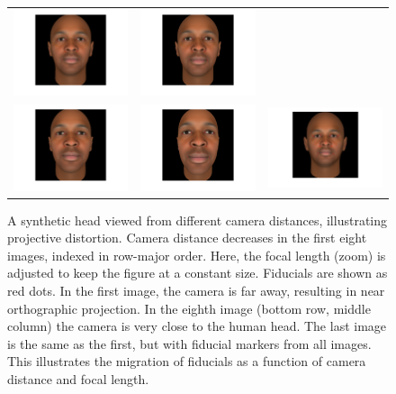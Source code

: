 \documentclass[runningheads]{llncs}
\begin{document}
\begin{figure}[ht!]
\begin{tabular}{ccc}
\includegraphics[width=.33\linewidth]{resources/figures/extracted_fiducial_0003.png} &
\includegraphics[width=.33\linewidth]{resources/figures/extracted_fiducial_0004.png} \\
\includegraphics[width=.33\linewidth]{resources/figures/extracted_fiducial_0005.png} &
\includegraphics[width=.33\linewidth]{resources/figures/extracted_fiducial_0007.png} &
\includegraphics[width=.33\linewidth]{resources/figures/fiducial_migration.png}
\end{tabular}
\caption{
A synthetic head viewed from different camera distances, illustrating projective distortion.
Camera distance decreases in the first eight images, indexed in row-major order.
Here, the focal length (zoom) is adjusted to keep the figure at a constant size.
Fiducials are shown as red dots.
In the first image, the camera is far away, resulting in near orthographic projection.
In the eighth image (bottom row, middle column) the camera is very close to the human head.  
The last image is the same as the first, but with fiducial markers from all images.
This illustrates the migration of fiducials as a function of camera distance and focal length. 
} 
\label{fig:fiducial_migration}
\end{figure}
\end{document}
